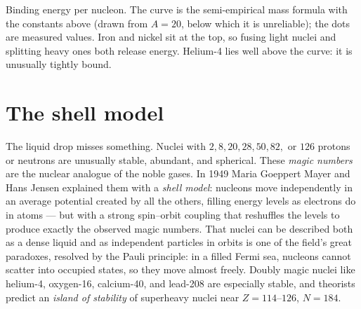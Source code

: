 \begin{center}
\begin{minipage}{\linewidth}

{\small Binding energy per nucleon. The curve is the semi-empirical mass formula with the constants above (drawn from $A = 20$, below which it is unreliable); the dots are measured values. Iron and nickel sit at the top, so fusing light nuclei and splitting heavy ones both release energy. Helium-4 lies well above the curve: it is unusually tightly bound.}
\end{minipage}
\end{center}

\section{The shell model}

The liquid drop misses something. Nuclei with $2, 8, 20, 28, 50, 82,$ or $126$ protons or neutrons are unusually stable, abundant, and spherical. These \emph{magic numbers} are the nuclear analogue of the noble gases. In 1949 Maria Goeppert Mayer and Hans Jensen explained them with a \emph{shell model}: nucleons move independently in an average potential created by all the others, filling energy levels as electrons do in atoms --- but with a strong spin--orbit coupling that reshuffles the levels to produce exactly the observed magic numbers. That nuclei can be described both as a dense liquid and as independent particles in orbits is one of the field's great paradoxes, resolved by the Pauli principle: in a filled Fermi sea, nucleons cannot scatter into occupied states, so they move almost freely. Doubly magic nuclei like helium-4, oxygen-16, calcium-40, and lead-208 are especially stable, and theorists predict an \emph{island of stability} of superheavy nuclei near $Z = 114$--$126$, $N = 184$.


